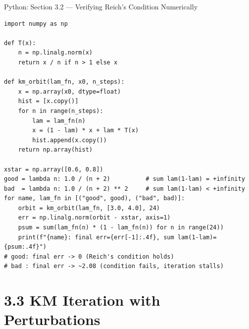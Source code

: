 \documentclass[aspectratio=169,10pt]{beamer}
\begin{document}
\begin{frame}[fragile]{Python: Section 3.2 --- Verifying Reich's Condition Numerically}
  \begin{lstlisting}[style=python]
import numpy as np

def T(x):
    n = np.linalg.norm(x)
    return x / n if n > 1 else x

def km_orbit(lam_fn, x0, n_steps):
    x = np.array(x0, dtype=float)
    hist = [x.copy()]
    for n in range(n_steps):
        lam = lam_fn(n)
        x = (1 - lam) * x + lam * T(x)
        hist.append(x.copy())
    return np.array(hist)

xstar = np.array([0.6, 0.8])
good = lambda n: 1.0 / (n + 2)          # sum lam(1-lam) = +infinity
bad  = lambda n: 1.0 / (n + 2) ** 2     # sum lam(1-lam) < +infinity
for name, lam_fn in [("good", good), ("bad", bad)]:
    orbit = km_orbit(lam_fn, [3.0, 4.0], 24)
    err = np.linalg.norm(orbit - xstar, axis=1)
    psum = sum(lam_fn(n) * (1 - lam_fn(n)) for n in range(24))
    print(f"{name}: final err={err[-1]:.4f}, sum lam(1-lam)={psum:.4f}")
# good: final err -> 0 (Reich's condition holds)
# bad : final err -> ~2.08 (condition fails, iteration stalls)
  \end{lstlisting}
\end{frame}

\section{3.3 KM Iteration with Perturbations}
\end{document}

